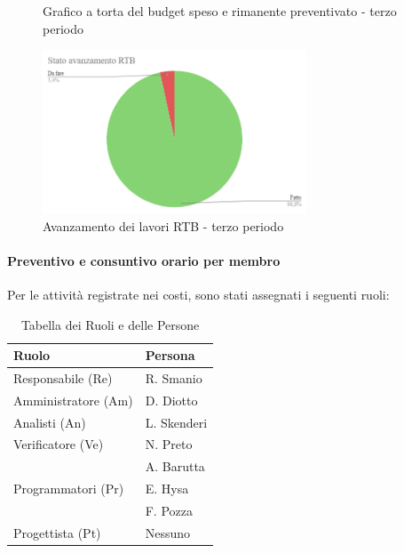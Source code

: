 \begin{figure}[H]
    \centering
    \begin{minipage}[b]{0.45\textwidth}
        \centering
        \caption{Grafico a torta del budget speso e rimanente preventivato - terzo periodo}
        \label{fig:Budget_speso_3}
    \end{minipage}
    
    \vspace{1cm}

    \begin{minipage}[b]{0.70\textwidth}
        \centering
        \includegraphics[width=0.7\textwidth]{../Images/avanzamento3Periodo.png}
        \caption{Avanzamento dei lavori RTB - terzo periodo}
        \label{fig:Avanzamento_RTB_3}
    \end{minipage}
\end{figure}

\paragraph{Preventivo e consuntivo orario per membro} \hspace{1pt}
Per le attività registrate nei costi, sono stati assegnati i seguenti ruoli:  

\begin{table}[H]
    \centering
    \begin{tabular}{|l|l|}
    \hline
    \textbf{Ruolo} & \textbf{Persona} \\
    \hline
    \hline
    Responsabile (Re) & R. Smanio \\
    \hline
    Amministratore (Am) & D. Diotto \\
    \hline
    Analisti (An) & L. Skenderi \\
    \hline
    Verificatore (Ve) & N. Preto \\
     & A. Barutta \\
     \hline
    Programmatori (Pr) & E. Hysa \\
     & F. Pozza \\
     \hline
    Progettista (Pt) & Nessuno \\
    \hline
    \end{tabular}
    \caption{Tabella dei Ruoli e delle Persone}
    \label{tab:Ruoli_persone_3}
    \end{table}
    

